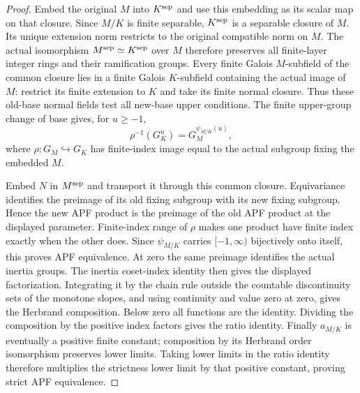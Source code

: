 \begin{proof}
Embed the original $M$ into $K^{\rm sep}$ and use this embedding
as its scalar map on that closure. Since $M/K$ is finite separable,
$K^{\rm sep}$ is a separable closure of $M$. Its unique extension
norm restricts to the original compatible norm on $M$. The actual
isomorphism $M^{\rm sep}\simeq K^{\rm sep}$ over $M$ therefore
preserves all finite-layer integer rings and their ramification groups.
Every finite Galois $M$-subfield of the common closure lies in a
finite Galois $K$-subfield containing the actual image of $M$:
restrict its finite extension to $K$ and take its finite normal closure.
Thus these old-base normal fields test all new-base upper conditions.
The finite upper-group change of base gives, for $u\geq-1$,
\[
 \rho^{-1}(G_K^u)=G_M^{\psi_{M/K}(u)},
\]
where $\rho:G_M\hookrightarrow G_K$ has finite-index image equal
to the actual subgroup fixing the embedded $M$.

Embed $N$ in $M^{\rm sep}$ and transport it through this common
closure. Equivariance identifies the preimage of its old fixing
subgroup with its new fixing subgroup. Hence the new APF product
is the preimage of the old APF product at the displayed parameter.
Finite-index range of $\rho$ makes one product have finite index
exactly when the other does. Since $\psi_{M/K}$ carries
$[-1,\infty)$ bijectively onto itself, this proves APF equivalence.
At zero the same preimage identifies the actual inertia groups.
The inertia coset-index identity then gives the displayed factorization.
Integrating it by the chain rule outside the countable discontinuity
sets of the monotone slopes, and using continuity and value zero at
zero, gives the Herbrand composition. Below zero all functions are
the identity. Dividing the composition by the positive index factors
gives the ratio identity. Finally $a_{M/K}$ is eventually a positive
finite constant; composition by its Herbrand order isomorphism
preserves lower limits. Taking lower limits in the ratio identity
therefore multiplies the strictness lower limit by that positive
constant, proving strict APF equivalence.
\end{proof}

